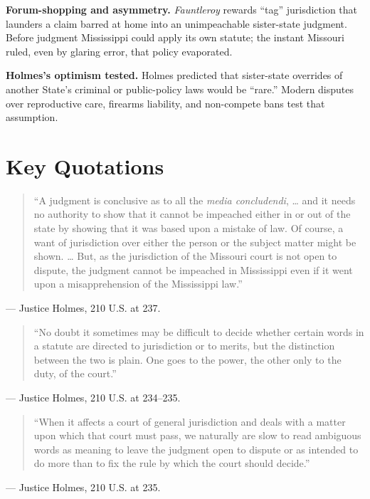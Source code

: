 \documentclass[12pt]{article}
\begin{document}
\textbf{Forum-shopping and asymmetry.} \textit{Fauntleroy} rewards ``tag'' jurisdiction that launders a claim barred at home into an unimpeachable sister-state judgment. Before judgment Mississippi could apply its own statute; the instant Missouri ruled, even by glaring error, that policy evaporated.

\textbf{Holmes's optimism tested.} Holmes predicted that sister-state overrides of another State's criminal or public-policy laws would be ``rare.'' Modern disputes over reproductive care, firearms liability, and non-compete bans test that assumption.

\section{Key Quotations}

\begin{quote}
``A judgment is conclusive as to all the \textit{media concludendi}, \ldots{} and it needs no authority to show that it cannot be impeached either in or out of the state by showing that it was based upon a mistake of law. Of course, a want of jurisdiction over either the person or the subject matter might be shown. \ldots{} But, as the jurisdiction of the Missouri court is not open to dispute, the judgment cannot be impeached in Mississippi even if it went upon a misapprehension of the Mississippi law.''
\end{quote}
\noindent --- Justice Holmes, 210 U.S. at 237.

\begin{quote}
``No doubt it sometimes may be difficult to decide whether certain words in a statute are directed to jurisdiction or to merits, but the distinction between the two is plain. One goes to the power, the other only to the duty, of the court.''
\end{quote}
\noindent --- Justice Holmes, 210 U.S. at 234--235.

\begin{quote}
``When it affects a court of general jurisdiction and deals with a matter upon which that court must pass, we naturally are slow to read ambiguous words as meaning to leave the judgment open to dispute or as intended to do more than to fix the rule by which the court should decide.''
\end{quote}
\noindent --- Justice Holmes, 210 U.S. at 235.
\end{document}
